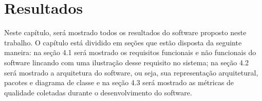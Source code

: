 \chapter{Resultados}

Neste capítulo, será mostrado todos os resultados do software proposto neste trabalho. O capítulo está dividido
em seções que estão disposta da seguinte maneira: na seção 4.1 será mostrado os requisitos funcionais e não funcionais
do software lincando com uma ilustração desse requisito no sistema; na seção 4.2 será mostrado a arquitetura do
software, ou seja, sua representação arquitetural, pacotes e diagrama de classe e na seção 4.3 será mostrado as
métricas de qualidade coletadas durante o desenvolvimento do software.
